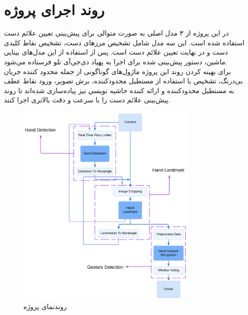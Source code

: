 \section{روند اجرای پروژه}
در این پروژه از ۳ مدل اصلی به صورت متوالی برای پیش‌بینی تعیین علائم دست استفاده شده‌ است. این سه مدل شامل تشخیص مرز‌های دست، تشخیص نقاط کلیدی دست و در نهایت تعیین علائم دست است. پس از استفاده از این مدل‌های بینایی ماشین، دستور پیش‌بینی شده برای اجرا به پهپاد دی‌جی‌آی تلو فرستاده می‌شود.
\\
برای بهینه کردن روند این پروژه ماژول‌های گوناگونی از جمله محدود كننده جريان بی‌درنگ، تشخيص با استفاده از مستطيل محدودکننده، برش تصوير،  ورود نقاط عطف به مستطيل محدودکننده و ارائه كننده حاشيه نويسي نیز پیاده‌سازی شده‌اند تا روند پیش‌بینی علائم دست را با سرعت و دقت بالاتری اجرا کنند.

\begin{figure}[h]
    \centering
    \includegraphics[width=0.8\textwidth]{flowchart.png}
    \caption{روندنمای پروژه}
\end{figure}




